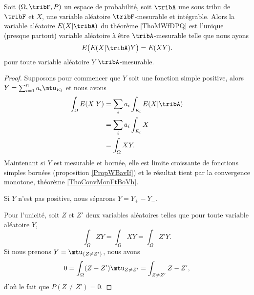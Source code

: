 \begin{proposition}
    Soit \( (\Omega,\tribF,P)\) un espace de probabilité, soit \( \tribA\) une sous tribu de \( \tribF\) et \( X\), une variable aléatoire \( \tribF\)-mesurable et intégrable. Alors la variable aléatoire \( E(X|\tribA)\) du théorème \ref{ThoMWfDPQ} est l'unique (presque partout) variable aléatoire à être \( \tribA\)-mesurable telle que nous ayons
    \begin{equation}
        E\big( E(X|\tribA)Y \big)=E(XY).
    \end{equation}  
    pour toute variable aléatoire \( Y\) \( \tribA\)-mesurable.
\end{proposition}

\begin{proof}
    Supposons pour commencer que \( Y\) soit une fonction simple positive, alors \( Y=\sum_{i=1}^na_i\mtu_{E_i}\) et nous avons
    \begin{subequations}
        \begin{align}
            \int_{\Omega}E(X|Y)&=\sum_{i}a_i\int_{E_i}E(X|\tribA)\\
            &=\sum_ia_i\int_{E_i}X\\
            &=\int_{\Omega}XY.
        \end{align}
    \end{subequations}
    Maintenant si \( Y\) est mesurable et bornée, elle est limite croissante de fonctions simples bornées (proposition \ref{PropWBavIf}) et le résultat tient par la convergence monotone, théorème \ref{ThoConvMonFtBoVh}.

    Si \( Y\) n'est pas positive, nous séparons \( Y=Y_+-Y_-\).

    Pour l'unicité, soit \( Z\) et \( Z'\) deux variables aléatoires telles que pour toute variable aléatoire \( Y\),
    \begin{equation}
        \int_{\Omega}ZY=\int_{\Omega}XY=\int_{\Omega}Z'Y.
    \end{equation}
    Si nous prenons \( Y=\mtu_{\{ Z\neq Z' \}}\), nous avons
    \begin{equation}
        0=\int_{\Omega}(Z-Z')\mtu_{Z\neq Z'}=\int_{Z\neq Z'}Z-Z',
    \end{equation}
    d'où le fait que \( P(Z\neq Z')=0\).
\end{proof}


